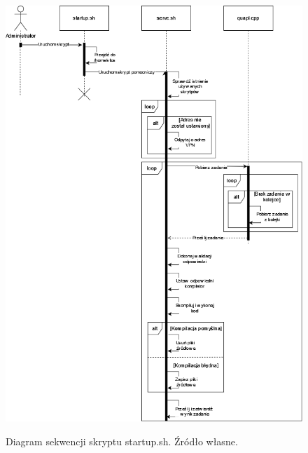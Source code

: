 \begin{figure}[!h]
	\begin{center}
		\resizebox{1.0\textwidth}{!} {
			\includegraphics{img/2/startup.png}
		}
		\caption[Diagram sekwencji skryptu startup.sh]{Diagram sekwencji skryptu startup.sh. Źródło własne.}
	\end{center}
\end{figure}

